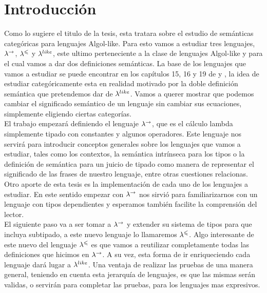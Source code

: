 \chapter{Introducci\'on}
\label{chap:intro}

Como lo sugiere el titulo de la tesis, esta tratara sobre el estudio
de sem\'anticas categ\'oricas para lenguajes Algol-like. Para esto
vamos a estudiar tres lenguajes, $\lambda^{\rightarrow}$, $\lambda^{\leqslant}$ y $\lambda^{like}$,
este ultimo perteneciente a la clase de lenguajes Algol-like y para el cual
vamos a dar dos definiciones sem\'anticas.
La base de los lenguajes que vamos a estudiar se puede encontrar en los
cap\'itulos 15, 16 y 19 de \cite{reynolds2009theories} y \cite{olesfunctorcategories}, 
la idea de estudiar
categ\'oricamente esta en realidad motivado por la doble definici\'on
sem\'antica que pretendemos dar de $\lambda^{like}$. Vamos a querer mostrar
que podemos cambiar el significado
sem\'antico de un lenguaje sin cambiar sus ecuaciones, simplemente
eligiendo ciertas categor\'ias.\\

El trabajo empezar\'a definiendo el lenguaje $\lambda^{\rightarrow}$, que es el
c\'alculo lambda simplemente tipado con constantes y algunos operadores.
Este lenguaje nos servir\'a para introducir conceptos generales sobre 
los lenguajes que vamos a estudiar, tales como
los contextos, la sem\'antica intr\'inseca para los tipos o la definici\'on
de sem\'antica para un juicio de tipado como manera de representar el significado
de las frases de nuestro lenguaje, entre otras cuestiones relacionas. 
Otro aporte de esta tesis es la implementaci\'on de cada uno de los lenguajes
a estudiar. En este sentido empezar con $\lambda^{\rightarrow}$ nos sirvi\'o para
familiarizarnos con un lenguaje con tipos dependientes y esperamos tambi\'en
facilite la comprensi\'on del lector.\\

El siguiente paso va a ser tomar a $\lambda^{\rightarrow}$ y extender su sistema de 
tipos para que incluya subtipado, a este nuevo lenguaje lo llamaremos
$\lambda^{\leqslant}$. Algo interesante de este nuevo del lenguaje $\lambda^{\leqslant}$
es que vamos a reutilizar completamente todas las definiciones que hicimos
en $\lambda^{\rightarrow}$. A su vez, esta forma de ir enriqueciendo cada lenguaje 
dar\'a lugar a $\lambda^{like}$. Una ventaja de realizar las pruebas de una manera 
general, teniendo en cuenta esta jerarqu\'ia de lenguajes, es que las mismas
ser\'an validas, o servir\'an para completar las pruebas, para los
lenguajes mas expresivos.\\

